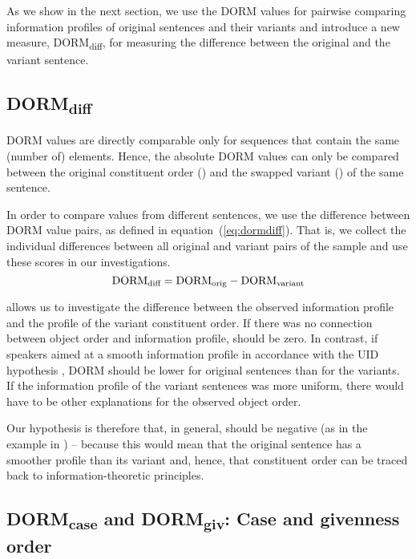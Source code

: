 \documentclass[output=paper,colorlinks,citecolor=brown]{langscibook}
\begin{document}
As we show in the next section, we use the DORM values for pairwise comparing information profiles of original sentences and their variants  and introduce a new measure, DORM\textsubscript{diff}, for measuring the difference between the original and the variant sentence.

\subsection{DORM\textsubscript{diff}}\label{sec:dormdiff1}

DORM values are directly comparable only for sequences that contain the same (number of) elements. Hence, the absolute DORM values can only be compared between the original constituent order (\Dorig) and the swapped variant (\Dvariant) of the same sentence. 

In order to compare values from different sentences, we use the difference between DORM value pairs, as defined in equation~(\ref{eq:dormdiff}). That is, we collect the individual differences between all original and variant pairs of the sample and use these scores in our investigations.
\begin{equation}
\textnormal{DORM}\textsubscript{diff} = \textnormal{DORM}\textsubscript{orig} - \textnormal{DORM}\textsubscript{variant} \label{eq:dormdiff}    
\end{equation}

\DDIFF allows us to investigate the difference between the observed information profile and the profile of the variant constituent order. 
If there was no connection between object order and information profile, \DDIFF should be zero. In contrast, if speakers aimed at a smooth information profile in accordance with the UID hypothesis \citep{Levy.Jaeger}, DORM should be lower for original sentences than for the variants. If the information profile of the variant sentences was more uniform, there would have to be other explanations for the observed object order.

Our hypothesis is therefore that, in general, \DDIFF should be negative (as in the example in ) -- because this would mean that the original sentence has a smoother profile than its variant and, hence, that constituent order can be traced back to information-theoretic principles.

\subsection{DORM\textsubscript{case} and DORM\textsubscript{giv}: Case and givenness order}\label{sec:dormdiff2}
\end{document}

